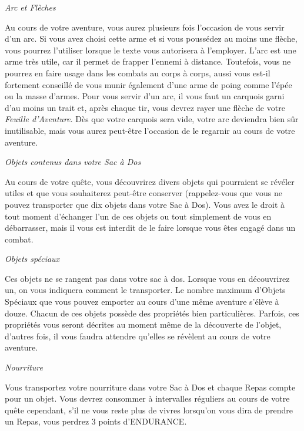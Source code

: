 \documentclass[10pt]{book}
\begin{document}
\begin{center}
  \textit{Arc et Flèches}
\end{center}
Au cours de votre aventure, vous aurez plusieurs fois l'occasion de vous servir d'un arc.
Si vous avez choisi cette arme et si vous poussédez au moins une flèche, vous pourrez
l'utiliser lorsque le texte vous autorisera à l'employer. L'arc est une arme très utile,
car il permet de frapper l'ennemi à distance. Toutefois, vous ne pourrez en faire usage
dans les combats au corps à corps, aussi vous est-il fortement conseillé de vous munir
également d'une arme de poing comme l'épée ou la masse d'armes. Pour vous servir d'un arc,
il vous faut un carquois garni d'au moins un trait et, après chaque tir, vous devrez rayer
une flèche de votre \textit{Feuille d'Aventure}. Dès que votre carquois sera vide, votre
arc deviendra bien sûr inutilisable, mais vous aurez peut-être l'occasion de le regarnir
au cours de votre aventure.\\

\begin{center}
  \textit{Objets contenus dans votre Sac à Dos}
\end{center}
Au cours de votre quête, vous découvrirez divers objets qui pourraient se révéler
utiles et que vous souhaiterez peut-être conserver (rappelez-vous que vous ne pouvez
transporter que dix objets dans votre Sac à Dos). Vous avez le droit à tout moment
d'échanger l'un de ces objets ou tout simplement de vous en débarrasser, mais il vous
est interdit de le faire lorsque vous êtes engagé dans un combat.\\

\begin{center}
  \textit{Objets spéciaux}
\end{center}
Ces objets ne se rangent pas dans votre sac à dos. Lorsque vous en découvrirez un,
on vous indiquera comment le transporter. Le nombre maximum d'Objets Spéciaux que vous
pouvez emporter au cours d'une même aventure s'élève à douze. Chacun de ces objets possède
des propriétés bien particulières. Parfois, ces propriétés vous seront décrites au moment
même de la découverte de l'objet, d'autres fois, il vous faudra attendre qu'elles se
révèlent au cours de votre aventure.\\

\begin{center}
  \textit{Nourriture}
\end{center}
Vous transportez votre nourriture dans votre Sac à Dos et chaque Repas compte pour
un objet. Vous devrez consommer à intervalles réguliers au cours de votre quête cependant,
s'il ne vous reste plus de vivres lorsqu'on vous dira de prendre un Repas, vous perdrez
3 points d'ENDURANCE.\\
\end{document}
